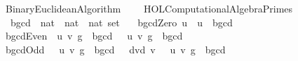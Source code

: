 %
\begin{isabellebody}%
%
%
\isadelimtheory
%
\endisadelimtheory
%
\isatagtheory
{}\isamarkupfalse%
\ Binary{\isacharunderscore}{\kern0pt}Euclidean{\isacharunderscore}{\kern0pt}Algorithm\ \isanewline
\ \ \ {\isachardoublequoteopen}HOL{\isacharminus}{\kern0pt}Computational{\isacharunderscore}{\kern0pt}Algebra{\isachardot}{\kern0pt}Primes{\isachardoublequoteclose}\ \isanewline
{}%
\endisatagtheory
{\isafoldtheory}%
%
\isadelimtheory
%
\endisadelimtheory
%
\isadelimdocument
%
\endisadelimdocument
%
\isatagdocument
%
\isamarkuptrue%
%
\endisatagdocument
{\isafolddocument}%
%
\isadelimdocument
%
\endisadelimdocument
{}\isamarkupfalse%
\ \ bgcd\ {\isacharcolon}{\kern0pt}{\isacharcolon}{\kern0pt}\ {\isachardoublequoteopen}{\isacharparenleft}{\kern0pt}nat\ {\isasymtimes}\ nat\ {\isasymtimes}\ nat{\isacharparenright}{\kern0pt}\ set{\isachardoublequoteclose}\ \isanewline
\ \ bgcdZero{\isacharcolon}{\kern0pt}\ {\isachardoublequoteopen}{\isacharparenleft}{\kern0pt}u{\isacharcomma}{\kern0pt}\ {}{\isacharcomma}{\kern0pt}\ u{\isacharparenright}{\kern0pt}\ {\isasymin}\ bgcd{\isachardoublequoteclose}\isanewline
{\isacharbar}{\kern0pt}\ bgcdEven{\isacharcolon}{\kern0pt}\ {\isachardoublequoteopen}{\isasymlbrakk}\ {\isacharparenleft}{\kern0pt}u{\isacharcomma}{\kern0pt}\ v{\isacharcomma}{\kern0pt}\ g{\isacharparenright}{\kern0pt}\ {\isasymin}\ bgcd\ {\isasymrbrakk}\ {\isasymLongrightarrow}\ {\isacharparenleft}{\kern0pt}{}{\isacharasterisk}{\kern0pt}u{\isacharcomma}{\kern0pt}\ {}{\isacharasterisk}{\kern0pt}v{\isacharcomma}{\kern0pt}\ {}{\isacharasterisk}{\kern0pt}g{\isacharparenright}{\kern0pt}\ {\isasymin}\ bgcd{\isachardoublequoteclose}\isanewline
{\isacharbar}{\kern0pt}\ bgcdOdd{\isacharcolon}{\kern0pt}\ \ {\isachardoublequoteopen}{\isasymlbrakk}\ {\isacharparenleft}{\kern0pt}u{\isacharcomma}{\kern0pt}\ v{\isacharcomma}{\kern0pt}\ g{\isacharparenright}{\kern0pt}\ {\isasymin}\ bgcd{\isacharsemicolon}{\kern0pt}\ {\isasymnot}\ {}\ dvd\ v\ {\isasymrbrakk}\ {\isasymLongrightarrow}\ {\isacharparenleft}{\kern0pt}{}{\isacharasterisk}{\kern0pt}u{\isacharcomma}{\kern0pt}\ v{\isacharcomma}{\kern0pt}\ g{\isacharparenright}{\kern0pt}\ {\isasymin}\ bgcd{\isachardoublequoteclose}\isanewline

\end{isabellebody}
